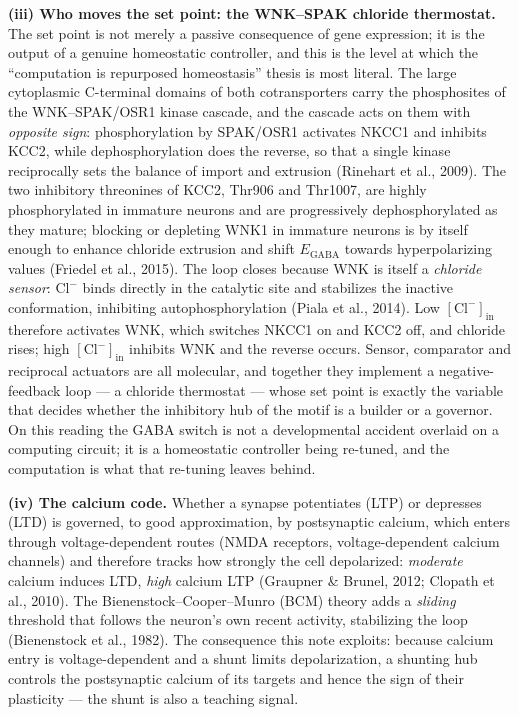 \documentclass[11pt,a4paper]{article}
\newcommand{\Clm}{\mathrm{Cl}^{-}}
\begin{document}
\textbf{(iii) Who moves the set point: the WNK--SPAK chloride thermostat.} The set point is not merely a passive consequence of gene expression; it is the output of a genuine homeostatic controller, and this is the level at which the ``computation is repurposed homeostasis'' thesis is most literal. The large cytoplasmic C-terminal domains of both cotransporters carry the phosphosites of the WNK--SPAK/OSR1 kinase cascade, and the cascade acts on them with \emph{opposite sign}: phosphorylation by SPAK/OSR1 activates NKCC1 and inhibits KCC2, while dephosphorylation does the reverse, so that a single kinase reciprocally sets the balance of import and extrusion (Rinehart et al., 2009). The two inhibitory threonines of KCC2, Thr906 and Thr1007, are highly phosphorylated in immature neurons and are progressively dephosphorylated as they mature; blocking or depleting WNK1 in immature neurons is by itself enough to enhance chloride extrusion and shift $E_{\mathrm{GABA}}$ towards hyperpolarizing values (Friedel et al., 2015). The loop closes because WNK is itself a \emph{chloride sensor}: $\Clm$ binds directly in the catalytic site and stabilizes the inactive conformation, inhibiting autophosphorylation (Piala et al., 2014). Low $[\Clm]_{\mathrm{in}}$ therefore activates WNK, which switches NKCC1 on and KCC2 off, and chloride rises; high $[\Clm]_{\mathrm{in}}$ inhibits WNK and the reverse occurs. Sensor, comparator and reciprocal actuators are all molecular, and together they implement a negative-feedback loop --- a chloride thermostat --- whose set point is exactly the variable that decides whether the inhibitory hub of the motif is a builder or a governor. On this reading the GABA switch is not a developmental accident overlaid on a computing circuit; it is a homeostatic controller being re-tuned, and the computation is what that re-tuning leaves behind.

\textbf{(iv) The calcium code.} Whether a synapse potentiates (LTP) or depresses (LTD) is governed, to good approximation, by postsynaptic calcium, which enters through voltage-dependent routes (NMDA receptors, voltage-dependent calcium channels) and therefore tracks how strongly the cell depolarized: \emph{moderate} calcium induces LTD, \emph{high} calcium LTP (Graupner \& Brunel, 2012; Clopath et al., 2010). The Bienenstock--Cooper--Munro (BCM) theory adds a \emph{sliding} threshold that follows the neuron's own recent activity, stabilizing the loop (Bienenstock et al., 1982). The consequence this note exploits: because calcium entry is voltage-dependent and a shunt limits depolarization, a shunting hub controls the postsynaptic calcium of its targets and hence the sign of their plasticity --- the shunt is also a teaching signal.
\end{document}
